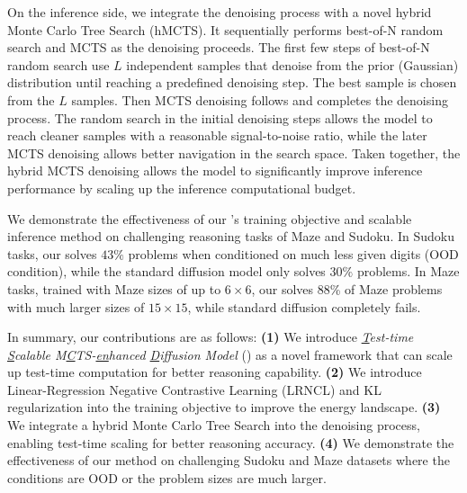 On the inference side, we integrate the denoising process with a novel hybrid Monte Carlo Tree Search (hMCTS). It sequentially performs best-of-N random search and MCTS as the denoising proceeds. The first few steps of best-of-N random search use $L$ independent samples that denoise from the prior (Gaussian) distribution until reaching a predefined denoising step. The best sample is chosen from the $L$ samples. Then MCTS denoising follows and completes the denoising process. The random search in the initial denoising steps allows the model to reach cleaner samples with a reasonable signal-to-noise ratio, while the later MCTS denoising allows better navigation in the search space. Taken together, the hybrid MCTS denoising allows the model to significantly improve inference performance by scaling up the inference computational budget.

We demonstrate the effectiveness of our \proj's training objective and scalable inference method on challenging reasoning tasks of Maze and Sudoku. In Sudoku tasks, our \proj solves $43\%$ problems when conditioned on much less given digits (OOD condition), while the standard diffusion model only solves $30\%$ problems. In Maze tasks,  trained with Maze sizes of up to $6\times6$, our \proj solves 88\% of Maze problems with much larger sizes of $15\times15$, while standard diffusion completely fails.


In summary, our contributions are as follows: \textbf{(1)} We introduce \emph{\underline{T}est-time \underline{S}calable M\underline{C}TS-\underline{en}hanced \underline{D}iffusion Model} (\proj) as a novel framework that can scale up test-time computation for better reasoning capability. \textbf{(2)} We introduce Linear-Regression Negative Contrastive Learning (LRNCL) and KL regularization into the training objective to improve the energy landscape. \textbf{(3)} We integrate a hybrid Monte Carlo Tree Search into the denoising process, enabling test-time scaling for better reasoning accuracy. \textbf{(4)} We demonstrate the effectiveness of our method on challenging Sudoku and Maze datasets where the conditions are OOD or the problem sizes are much larger. 


